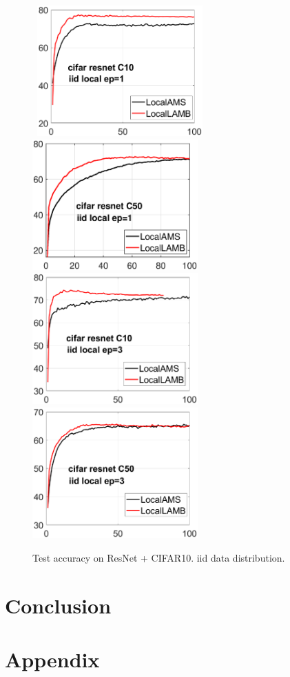 \documentclass{article}
\begin{document}
\begin{figure}[h]
    \begin{center}
        \mbox{
        \includegraphics[width=2.5in]{figure/cifar_testerror_resnet_ep1_client10_iid1.eps}
        \includegraphics[width=2.5in]{figure/cifar_testerror_resnet_ep1_client50_iid1.eps}
        }
        \mbox{
        \includegraphics[width=2.5in]{figure/cifar_testerror_resnet_ep3_client10_iid1.eps}
        \includegraphics[width=2.5in]{figure/cifar_testerror_resnet_ep3_client50_iid1.eps}
        }
    \end{center}
    \vspace{-0.1in}
	\caption{Test accuracy on ResNet + CIFAR10. iid data distribution.}
	\label{fig:cifar-resnet-iid}
\end{figure}

\section{Conclusion}\label{sec:conclusion}

\newpage





\appendix 

\section{Appendix}\label{sec:appendix}


\end{document}
